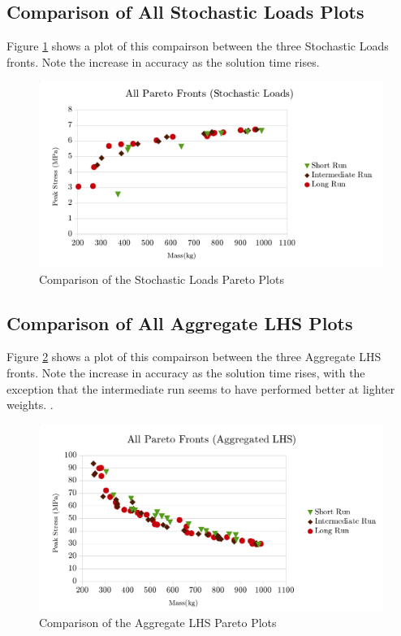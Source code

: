 \subsection{Comparison of All Stochastic Loads Plots}
Figure \ref{fig:pfront_comp_sto} shows a plot of this compairson between the three Stochastic Loads fronts. Note the increase in accuracy as the solution time rises. 

\begin{figure}[!htbp]
\includegraphics[width=\textwidth]{img/pf_comp_sto.png}
\caption{Comparison of the Stochastic Loads Pareto Plots}
\label{fig:pfront_comp_sto}
\end{figure}

\subsection{Comparison of All Aggregate LHS Plots}
Figure \ref{fig:pfront_comp_agg} shows a plot of this compairson between the three Aggregate LHS fronts. Note the increase in accuracy as the solution time rises, with the exception that the intermediate run seems to have performed better at lighter weights. . 

\begin{figure}[!htbp]
\includegraphics[width=\textwidth]{img/pf_comp_agg.png}
\caption{Comparison of the Aggregate LHS Pareto Plots}
\label{fig:pfront_comp_agg}
\end{figure}
